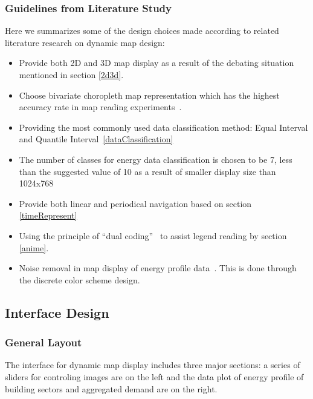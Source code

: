 \documentclass[hidelinks,12pt]{article}
\begin{document}
\subsubsection{Guidelines from Literature Study}
Here we summarizes some of the design choices made according to
related literature research on dynamic map design:
\begin{itemize}
\item Provide both 2D and 3D map display as a result of the debating
  situation mentioned in section \ref{2d3d}.
\item Choose bivariate choropleth map representation which has the
  highest accuracy rate in map reading experiments~\cite{Elmer2012}.
\item Providing the most commonly used data classification method:
  Equal Interval and Quantile Interval~\ref{dataClassification}
\item The number of classes for energy data classification is chosen
  to be 7, less than the suggested value of 10 as a result of smaller
  display size than 1024x768~\cite{doi:10.1559/1523040639298}
\item Provide both linear and periodical navigation based on section
  \ref{timeRepresent}
\item Using the principle of ``dual coding''~\cite{Resch2014} to
  assist legend reading by section \ref{anime}.
\item Noise removal in map display of energy profile
  data~\cite{Dorling1992}. This is done through the discrete color
  scheme design.
\end{itemize}

\subsection{Interface Design}\label{interfaceDesign}
\subsubsection {General Layout}
The interface for dynamic map display includes three major sections: a
series of sliders for controling images are on the left and the data
plot of energy profile of building sectors and aggregated demand are
on the right.
\end{document}
